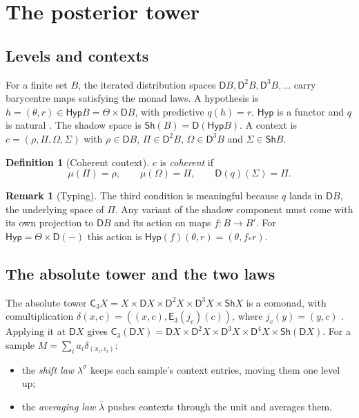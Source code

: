 \documentclass[11pt]{article}
\theoremstyle{definition}
\newtheorem{definition}[theorem]{Definition}
\newtheorem{remark}[theorem]{Remark}
\newcommand{\D}{\mathsf D}
\newcommand{\C}{\mathsf C}
\newcommand{\Sh}{\mathsf{Sh}}
\newcommand{\Hyp}{\mathsf{Hyp}}
\newcommand{\ls}{\lambda^{\sigma}}
\newcommand{\lb}{\bar\lambda}
\newcommand{\E}{\mathsf E}
\begin{document}
\section{The posterior tower}\label{sec:tower}

\subsection{Levels and contexts}
For a finite set $B$, the iterated distribution spaces $\D B,\D^2B,\D^3B,\dots$ carry barycentre maps satisfying the monad laws. A
hypothesis is $h=(\theta,r)\in\Hyp B=\Theta\times\D B$, with predictive $q(h)=r$. $\Hyp$ is a functor and $q$ is natural
\cite[Def.~3.1]{Tower}. The shadow space is $\Sh(B)=\D(\Hyp B)$. A context is $c=(\rho,\Pi,\Omega,\Sigma)$ with $\rho\in\D B$,
$\Pi\in\D^2B$, $\Omega\in\D^3B$ and $\Sigma\in\Sh B$.

\begin{definition}[Coherent context]\label{def:coherent}
$c$ is \emph{coherent} if
\begin{equation}\label{eq:coherent}
\mu(\Pi)=\rho,\qquad\mu(\Omega)=\Pi,\qquad\D(q)(\Sigma)=\Pi .
\end{equation}
\end{definition}

\begin{remark}[Typing]
The third condition is meaningful because $q$ lands in $\D B$, the underlying space of $\Pi$. Any variant of the shadow component must
come with its own projection to $\D B$ and its action on maps $f\colon B\to B'$. For $\Hyp=\Theta\times\D(-)$ this action is
$\Hyp(f)(\theta,r)=(\theta,f_*r)$.
\end{remark}

\subsection{The absolute tower and the two laws}
The absolute tower $\C_3X=X\times\D X\times\D^2X\times\D^3X\times\Sh X$ is a comonad, with comultiplication
$\delta(x,c)=((x,c),\E_3(j_c)(c))$, where $j_c(y)=(y,c)$ \cite[\S6]{Tower}. Applying it at $\D X$ gives
$\C_3(\D X)=\D X\times\D^2X\times\D^3X\times\D^4X\times\Sh(\D X)$. For a sample $M=\sum_ia_i\delta_{(x_i,c_i)}$:
\begin{itemize}
\item the \emph{shift law} $\ls$ keeps each sample's context entries, moving them one level up;
\item the \emph{averaging law} $\lb$ pushes contexts through the unit and averages them.
\end{itemize}
\end{document}
